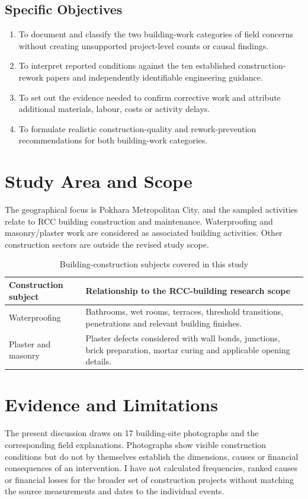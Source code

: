 \subsection{Specific Objectives}
\begin{enumerate}
\item To document and classify the two building-work categories of field concerns without creating unsupported project-level counts or causal findings.
\item To interpret reported conditions against the ten established construction-rework papers and independently identifiable engineering guidance.
\item To set out the evidence needed to confirm corrective work and attribute additional materials, labour, costs or activity delays.
\item To formulate realistic construction-quality and rework-prevention recommendations for both building-work categories.
\end{enumerate}

\section{Study Area and Scope}
The geographical focus is Pokhara Metropolitan City, and the sampled activities relate to RCC building construction and maintenance. Waterproofing and masonry/plaster work are considered as associated building activities. Other construction sectors are outside the revised study scope.

\begin{table}[htbp]
\caption{Building-construction subjects covered in this study}
\label{tab:worktypes}
\centering
\begin{tabularx}{\textwidth}{@{}L{3.6cm}X@{}}
\toprule Construction subject & Relationship to the RCC-building research scope\\ \midrule
Waterproofing & Bathrooms, wet rooms, terraces, threshold transitions, penetrations and relevant building finishes.\\
Plaster and masonry & Plaster defects considered with wall bonds, junctions, brick preparation, mortar curing and applicable opening details.\\ \bottomrule
\end{tabularx}
\end{table}

\section{Evidence and Limitations}
The present discussion draws on 17 building-site photographs and the corresponding field explanations. Photographs show visible construction conditions but do not by themselves establish the dimensions, causes or financial consequences of an intervention. I have not calculated frequencies, ranked causes or financial losses for the broader set of construction projects without matching the source measurements and dates to the individual events.


